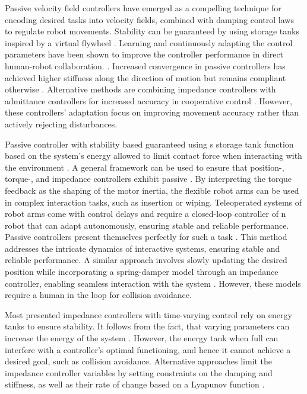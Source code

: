 Passive velocity field controllers have emerged as a compelling technique for encoding desired tasks into velocity fields, combined with damping control laws to regulate robot movements. Stability can be guaranteed by using storage tanks inspired by a virtual flywheel \cite{li1999passive}. 
Learning and continuously adapting the control parameters have been shown to improve the controller performance in direct human-robot collaboration. 
\cite{gribovskaya2011motion}.
Increased convergence in passive controllers has achieved higher stiffness along the direction of motion but remains compliant otherwise \cite{kronander2015passive}. 
Alternative methods are combining impedance controllers with admittance controllers for increased accuracy in cooperative control
\cite{fujiki2022series}.
However, these controllers' adaptation focus on improving movement accuracy rather than actively rejecting disturbances.

Passive controller with stability based guaranteed using s storage tank function based on the system's energy allowed to limit contact force when interacting with the environment \cite{kishi2003passive}.
A general framework can be used to ensure that position-, torque-, and impedance controllers exhibit passive \cite{albu2007unified}. By interpreting the torque feedback as the shaping of the motor inertia, the flexible robot arms can be used in complex interaction tasks, such as insertion or wiping.
Teleoperated systems of robot arms come with control delays and require a closed-loop controller of n robot that can adapt autonomously, ensuring stable and reliable performance. Passive controllers present themselves perfectly for such a task  \cite{stramigioli2005sampled}. This method addresses the intricate dynamics of interactive systems, ensuring stable and reliable performance.
A similar approach involves slowly updating the desired position while incorporating a spring-damper model through an impedance controller, enabling seamless interaction with the system \cite{lee2010passive}.
However, these models require a human in the loop for collision avoidance.

Most presented impedance controllers with time-varying control rely on energy tanks to ensure stability. 
It follows from the fact, that varying parameters can increase the energy of the system \cite{ferraguti2013tank}. However, the energy tank when full can interfere with a controller's optimal functioning, and hence it cannot achieve a desired goal, such as collision avoidance.
Alternative approaches limit the impedance controller variables  by setting constraints on the damping and stiffness, as well as their rate of change based on a Lyapunov function \cite{kronander2016stability}.


